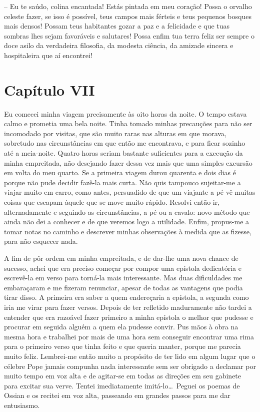 -- Eu te saúdo, colina encantada! Estás pintada em meu coração! Possa o
orvalho celeste fazer, se isso é possível, teus campos mais férteis e
teus pequenos bosques mais densos! Possam teus habitantes gozar a paz e
a felicidade e que tuas sombras lhes sejam favoráveis e salutares!
Possa enfim tua terra feliz ser sempre o doce asilo da verdadeira
filosofia, da modesta ciência, da amizade sincera e hospitaleira que aí
encontrei!

\section*{Capítulo VII}

 Eu comecei minha viagem precisamente às oito horas da noite. O tempo
estava calmo e prometia uma bela noite. Tinha tomado minhas precauções
para não ser incomodado por visitas, que são muito raras nas alturas em
que morava, sobretudo nas circunstâncias em que então me encontrava, e
para ficar sozinho até a meia-noite. Quatro horas seriam bastante
suficientes para a execução da minha empreitada, não desejando fazer
dessa vez mais que uma simples excursão em volta do meu quarto. Se a
primeira viagem durou quarenta e dois dias é porque não pude decidir
fazê-la mais curta. Não quis tampouco sujeitar-me a viajar muito em
carro, como antes, persuadido de que um viajante a pé vê muitas coisas
que escapam àquele que se move muito rápido. Resolvi então ir,
alternadamente e seguindo as circunstâncias, a pé ou a cavalo: novo
método que ainda não dei a conhecer e de que veremos logo a utilidade.
Enfim, propus-me a tomar notas no caminho e descrever minhas
observações à medida que as fizesse, para não esquecer nada.

 A fim de pôr ordem em minha empreitada, e de dar-lhe uma nova chance de
sucesso, achei que era preciso começar por compor uma epístola
dedicatória e escrevê-la em verso para torná-la mais interessante. Mas
duas dificuldades me embaraçaram e me fizeram renunciar, apesar de
todas as vantagens que podia tirar disso. A primeira era saber a quem
endereçaria a epístola, a segunda como iria me virar para fazer versos.
Depois de ter refletido maduramente não tardei a entender que era
razoável fazer primeiro a minha epístola o melhor que pudesse e
procurar em seguida alguém a quem ela pudesse convir. Pus mãos à obra
na mesma hora e trabalhei por mais de uma hora sem conseguir encontrar
uma rima para o primeiro verso que tinha feito e que queria manter,
porque me parecia muito feliz. Lembrei-me então muito a propósito de
ter lido em algum lugar que o célebre Pope jamais compunha nada
interessante sem ser obrigado a declamar por muito tempo em voz alta e
de agitar-se em todas as direções em seu gabinete para excitar sua
verve. Tentei imediatamente imitá-lo\ldots\ Peguei os poemas de Ossian e os
recitei em voz alta, passeando em grandes passos para me dar
entusiasmo. 

